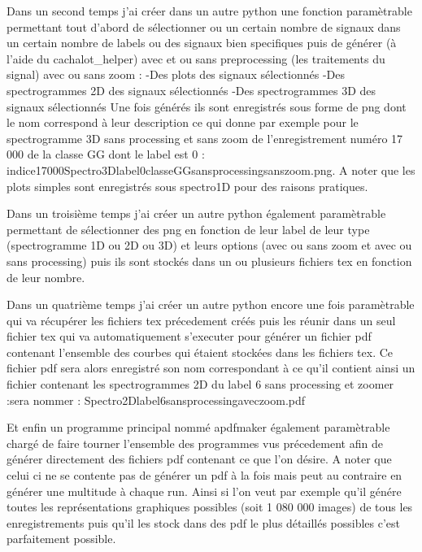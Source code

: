 Dans un second temps j'ai créer dans un autre python une fonction paramètrable permettant tout d'abord de sélectionner ou un certain nombre de signaux dans un certain nombre de labels ou des signaux bien specifiques puis de générer (à l'aide du cachalot{\_}helper) avec et ou sans preprocessing (les traitements du signal) avec ou sans zoom :
-Des plots des signaux sélectionnés
-Des spectrogrammes 2D des signaux sélectionnés
-Des spectrogrammes 3D des signaux sélectionnés
Une fois générés ils sont enregistrés sous forme de png dont le nom correspond à leur description ce qui donne par exemple pour le spectrogramme 3D sans processing et sans zoom de l'enregistrement numéro 17 000 de la classe GG dont le label est 0 :
indice17000Spectro3Dlabel0classeGGsansprocessingsanszoom.png. A noter que les plots simples sont enregistrés sous spectro1D pour des raisons pratiques.

Dans un troisième temps j'ai créer un autre python également paramètrable permettant de sélectionner des png en fonction de leur label de leur type (spectrogramme 1D ou 2D ou 3D) et leurs options (avec ou sans zoom et avec ou sans processing) puis ils sont stockés dans un ou plusieurs fichiers tex en fonction de leur nombre.

Dans un quatrième temps j'ai créer un autre python encore une fois paramètrable qui va récupérer les fichiers tex précedement créés puis les réunir dans un seul fichier tex qui va automatiquement s'executer pour générer un fichier pdf contenant l'ensemble des courbes qui étaient stockées dans les fichiers tex. Ce fichier pdf sera alors enregistré son nom correspondant à ce qu'il contient ainsi un fichier contenant les spectrogrammes 2D du label 6 sans processing et zoomer :sera nommer : Spectro2Dlabel6sansprocessingaveczoom.pdf

Et enfin un programme principal nommé apdfmaker également paramètrable chargé de faire tourner l'ensemble des programmes vus précedement afin de générer directement des fichiers pdf contenant ce que l'on désire. A noter que celui ci ne se contente pas de générer un pdf à la fois mais peut au contraire en générer une multitude à chaque run. Ainsi si l'on veut par exemple qu'il génére toutes les représentations graphiques possibles (soit 1 080 000 images) de tous les enregistrements puis qu'il les stock dans des pdf le plus détaillés possibles c'est parfaitement possible.
